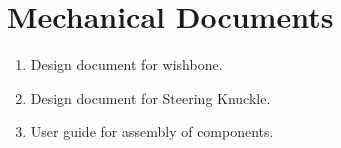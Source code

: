 \chapter{Mechanical Documents}
\label{App:mech}
\pagestyle{duncan}
\begin{enumerate}
\item Design document for wishbone.
\item Design document for Steering Knuckle.
\item User guide for assembly of components.
\end{enumerate}


